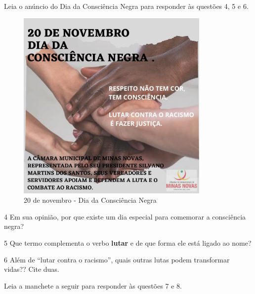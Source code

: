 Leia o anúncio do Dia da Consciência Negra para responder às questões 4, 5 e 6.


\begin{figure}
\centering
\includegraphics[width=3.69792in,height=3.69792in]{./_SAEB_9_POR/media/image32.jpeg}
\caption{20 de novembro - Dia da Consciência Negra}
\end{figure}

\num{4} Em sua opinião, por que existe um dia especial para comemorar a
consciência negra?


\num{5} Que termo complementa o verbo \textbf{lutar} e de que forma ele
está ligado ao nome?


\num{6} Além de ``lutar contra o racismo'', quais outras lutas podem
transformar vidas?? Cite duas.


Leia a manchete a seguir para responder às questões 7 e 8.

